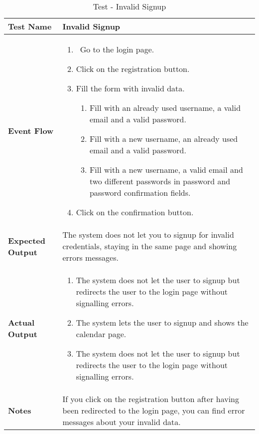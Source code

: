 \begin{table}[h]	
	\centering
	\def\arraystretch{1.5}
	\begin{tabular}{|m{7cm}|m{7cm}|}
		\hline
		\textbf{Test Name}            &  Invalid Signup  \\ \hline
		\textbf{Event Flow}             &  
		\begin{enumerate}
			\item~Go to the login page.
			\item Click on the registration button.
			\item Fill the form with invalid data.
			\begin{enumerate}[label*=\arabic*.]			
				\item Fill with an already used username, a valid email and a valid password.
				\item Fill with a new username, an already used email and a valid password.
				\item Fill with a new username, a valid email and two different passwords in password and password confirmation fields.
			\end{enumerate}
		\item Click on the confirmation button.
		\end{enumerate} \\ \hline
		\textbf{Expected Output}  &  The system does not let you to signup for invalid credentials, staying in the same page and showing errors messages.   \\ \hline
		\textbf{Actual Output}       & 
		\begin{enumerate}
			\item The system does not let the user to signup but redirects the user to the login page without signalling errors.
			\item The system lets the user to signup and shows the calendar page.
			\item The system does not let the user to signup but redirects the user to the login page without signalling errors.
		\end{enumerate}    \\ \hline
		\textbf{Notes} &  If you click on the registration button after having been redirected to the login page, you can find error messages about your invalid data. \\ \hline
	\end{tabular}
	\caption{Test - Invalid Signup}
\end{table}


